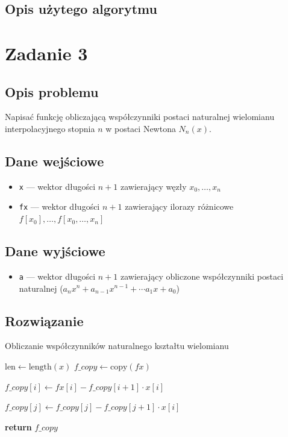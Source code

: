 \documentclass{article}
\begin{document}
\subsection*{Opis użytego algorytmu}

\section*{Zadanie 3}
\subsection*{Opis problemu}
	Napisać funkcję obliczającą współczynniki postaci naturalnej wielomianu interpolacyjnego stopnia $n$ w postaci Newtona $N_n(x)$.
\subsection*{Dane wejściowe}
	\begin{itemize}
	    \item \texttt{x} — wektor długości $n+1$ zawierający węzły $x_0,\dots,x_n$
	    \item \texttt{fx} — wektor długości $n+1$ zawierający ilorazy różnicowe $f[x_0], \dots, f[x_0,\dots,x_n]$
	\end{itemize}
\subsection*{Dane wyjściowe}
	\begin{itemize}
	    \item \texttt{a} — wektor długości $n+1$ zawierający obliczone współczynniki postaci naturalnej ($a_n x^n + a_{n-1} x^{n-1} + \cdots a_1 x + a_0$)
	\end{itemize}
\subsection*{Rozwiązanie}
	\begin{algorithm}
	\caption{Obliczanie współczynników naturalnego kształtu wielomianu}
	\begin{algorithmic}[1]
	        \State $\text{len} \gets \text{length}(x)$
	        \State $f\_copy \gets \text{copy}(fx)$
	        
	            \State $f\_copy[i] \gets fx[i] - f\_copy[i + 1] \cdot x[i]$
	            
	                \State $f\_copy[j] \gets f\_copy[j] - f\_copy[j + 1] \cdot x[i]$
	            \EndFor
	        \EndFor
	        
	        \State \textbf{return} $f\_copy$
	    \EndFunction
	\end{algorithmic}
	\end{algorithm}
\end{document}
